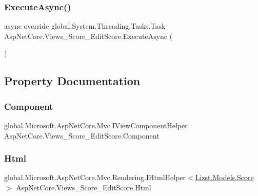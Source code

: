 \subsubsection{\texorpdfstring{ExecuteAsync()}{ExecuteAsync()}}
{\footnotesize\ttfamily async override global.\+System.\+Threading.\+Tasks.\+Task Asp\+Net\+Core.\+Views\+\_\+\+Score\+\_\+\+Edit\+Score.\+Execute\+Async (\begin{DoxyParamCaption}{ }\end{DoxyParamCaption})}



\subsection{Property Documentation}
\mbox{\label{class_asp_net_core_1_1_views___score___edit_score_a0caa5c42c5c085252b186e72634d95f3}} 
\subsubsection{\texorpdfstring{Component}{Component}}
{\footnotesize\ttfamily global.\+Microsoft.\+Asp\+Net\+Core.\+Mvc.\+I\+View\+Component\+Helper Asp\+Net\+Core.\+Views\+\_\+\+Score\+\_\+\+Edit\+Score.\+Component\hspace{0.3cm}{\ttfamily [get]}}

\mbox{\label{class_asp_net_core_1_1_views___score___edit_score_a70b80851df6537144ed7e3acb124c4b9}} 
\subsubsection{\texorpdfstring{Html}{Html}}
{\footnotesize\ttfamily global.\+Microsoft.\+Asp\+Net\+Core.\+Mvc.\+Rendering.\+I\+Html\+Helper$<$\mbox{\hyperlink{class_lizst_1_1_models_1_1_score}{Lizst.\+Models.\+Score}}$>$ Asp\+Net\+Core.\+Views\+\_\+\+Score\+\_\+\+Edit\+Score.\+Html\hspace{0.3cm}{\ttfamily [get]}}

